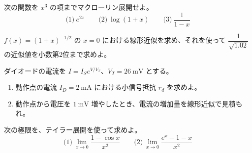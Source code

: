 \documentclass[11pt]{article}
\begin{document}

\problem[マクローリン展開]
次の関数を $x^3$ の項までマクローリン展開せよ。
\[ \text{(1)}\ e^{2x} \qquad \text{(2)}\ \log(1+x) \qquad \text{(3)}\ \frac{1}{1-x} \]
\workspace{50mm}

\problem[線形近似で計算する]
$f(x) = (1+x)^{-1/2}$ の $x=0$ における線形近似を求め、それを使って $\dfrac{1}{\sqrt{1.02}}$ の近似値を小数第2位まで求めよ。
\workspace{45mm}

\problem[ダイオードの小信号抵抗]
ダイオードの電流を $I = I_S e^{V/V_T}$、$V_T = 26\ \mathrm{mV}$ とする。
\begin{enumerate}[label=(\arabic*)]
\item 動作点の電流 $I_D = 2\ \mathrm{mA}$ における小信号抵抗 $r_d$ を求めよ。
\item 動作点から電圧を $1\ \mathrm{mV}$ 増やしたとき、電流の増加量を線形近似で見積もれ。
\end{enumerate}
\workspace{50mm}

\problem[テイラー展開で極限を求める]
次の極限を、テイラー展開を使って求めよ。
\[ \text{(1)}\ \lim_{x\to0}\frac{1-\cos x}{x^2} \qquad \text{(2)}\ \lim_{x\to0}\frac{e^x - 1 - x}{x^2} \]
\workspace{40mm}
\end{document}
